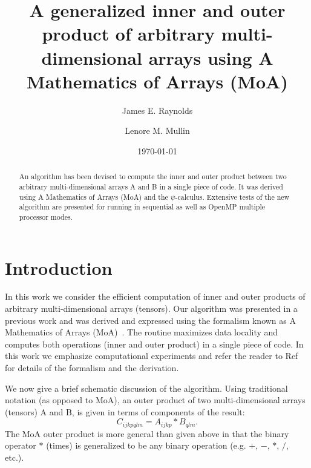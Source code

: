 \documentclass[aps,prl,twocolumn,groupedaddress,floatfix]{revtex4}
\begin{document}
\title{A generalized inner and outer product of arbitrary multi-dimensional 
arrays using A Mathematics of Arrays (MoA)}



\author{James E. Raynolds} 
\address{College of Nanoscale Science and Engineering, University
at Albany, State University of New York, Albany, NY}
\author{Lenore M. Mullin}
\address{National Science Foundation, Arlington, VA}
\affiliation{}



\date{\today}

\begin{abstract}
An algorithm has been devised to compute the inner and outer product 
between two arbitrary multi-dimensional arrays A and B in a single 
piece of code.  It was derived using A Mathematics of Arrays (MoA) and the 
$\psi$-calculus.  Extensive tests of the new algorithm are presented for
running in sequential as well as OpenMP multiple processor modes.

\end{abstract}

\pacs{}


\maketitle







\section{Introduction}

In this work we consider the efficient computation of inner and outer
products of arbitrary multi-dimensional arrays (tensors).  Our algorithm was 
presented in a previous work and was derived and expressed using the 
formalism known as A Mathematics of Arrays (MoA)~\cite{mul88}.  The routine 
maximizes data locality and computes both operations (inner and outer 
product) in a single piece of code.  In this work we emphasize computational
experiments and refer the reader to Ref~\citep{mul88} for details of the
formalism and the derivation.  

We now give a brief schematic discussion of the algorithm.  Using traditional
notation (as opposed to MoA), an outer product of two multi-dimensional
arrays (tensors) A and B, is given in terms of components of the result:
\begin{equation}
C_{ijkpqlm} = A_{ijkp} * B_{qlm}.
\label{outer}
\end{equation}
The MoA outer product is more general than given above in that the binary
operator $*$ (times) is generalized to be any binary operation (e.g. $+$,
$-$, $*$, $/$, etc.).
\end{document}

